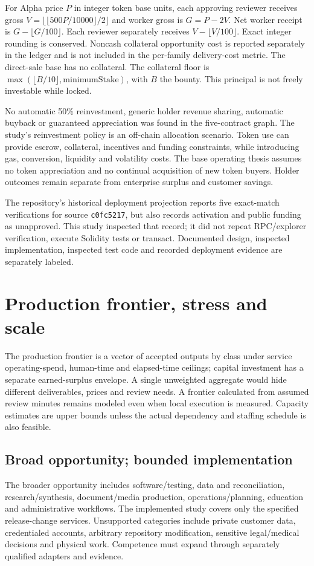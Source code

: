 \documentclass[11pt,a4paper]{article}
\newcommand{\code}[1]{\texttt{\small #1}}
\begin{document}
For Alpha price $P$ in integer token base units, each approving reviewer receives gross $V=\lfloor\lfloor500P/10000\rfloor/2\rfloor$ and worker gross is $G=P-2V$. Net worker receipt is $G-\lfloor G/100\rfloor$. Each reviewer separately receives $V-\lfloor V/100\rfloor$. Exact integer rounding is conserved. Noncash collateral opportunity cost is reported separately in the ledger and is not included in the per-family delivery-cost metric. The direct-sale base has no collateral. The collateral floor is $\max(\lfloor B/10\rfloor,\mathrm{minimumStake})$, with $B$ the bounty. This principal is not freely investable while locked.

No automatic 50\% reinvestment, generic holder revenue sharing, automatic buyback or guaranteed appreciation was found in the five-contract graph. The study's reinvestment policy is an off-chain allocation scenario. Token use can provide escrow, collateral, incentives and funding constraints, while introducing gas, conversion, liquidity and volatility costs. The base operating thesis assumes no token appreciation and no continual acquisition of new token buyers. Holder outcomes remain separate from enterprise surplus and customer savings.

The repository's historical deployment projection reports five exact-match verifications for source \code{c0fc5217}, but also records activation and public funding as unapproved. This study inspected that record; it did not repeat RPC/explorer verification, execute Solidity tests or transact. Documented design, inspected implementation, inspected test code and recorded deployment evidence are separately labeled.\citep{alpha_deployment}

\section{Production frontier, stress and scale}
\label{sec:scale}


The production frontier is a vector of accepted outputs by class under service operating-spend, human-time and elapsed-time ceilings; capital investment has a separate earned-surplus envelope. A single unweighted aggregate would hide different deliverables, prices and review needs. A frontier calculated from assumed review minutes remains modeled even when local execution is measured. Capacity estimates are upper bounds unless the actual dependency and staffing schedule is also feasible.

\subsection{Broad opportunity; bounded implementation}
The broader opportunity includes software/testing, data and reconciliation, research/synthesis, document/media production, operations/planning, education and administrative workflows. The implemented study covers only the specified release-change services. Unsupported categories include private customer data, credentialed accounts, arbitrary repository modification, sensitive legal/medical decisions and physical work. Competence must expand through separately qualified adapters and evidence.
\end{document}
